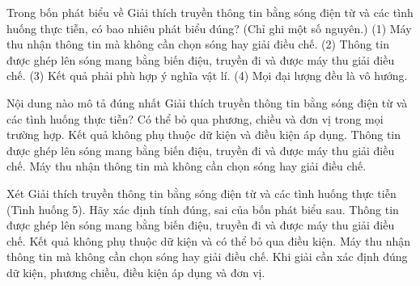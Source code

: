 \begin{ex}
Trong bốn phát biểu về Giải thích truyền thông tin bằng sóng điện từ và các tình huống thực tiễn, có bao nhiêu phát biểu đúng? (Chỉ ghi một số nguyên.) (1) Máy thu nhận thông tin mà không cần chọn sóng hay giải điều chế. (2) Thông tin được ghép lên sóng mang bằng biến điệu, truyền đi và được máy thu giải điều chế. (3) Kết quả phải phù hợp ý nghĩa vật lí. (4) Mọi đại lượng đều là vô hướng.
\end{ex}

\begin{ex}
Nội dung nào mô tả đúng nhất Giải thích truyền thông tin bằng sóng điện từ và các tình huống thực tiễn?
\choice
{Có thể bỏ qua phương, chiều và đơn vị trong mọi trường hợp.}
{Kết quả không phụ thuộc dữ kiện và điều kiện áp dụng.}
{\True Thông tin được ghép lên sóng mang bằng biến điệu, truyền đi và được máy thu giải điều chế.}
{Máy thu nhận thông tin mà không cần chọn sóng hay giải điều chế.}
\end{ex}

\begin{ex}
Xét Giải thích truyền thông tin bằng sóng điện từ và các tình huống thực tiễn (Tình huống 5). Hãy xác định tính đúng, sai của bốn phát biểu sau.
\choiceTF
{\True Thông tin được ghép lên sóng mang bằng biến điệu, truyền đi và được máy thu giải điều chế.}
{Kết quả không phụ thuộc dữ kiện và có thể bỏ qua điều kiện.}
{Máy thu nhận thông tin mà không cần chọn sóng hay giải điều chế.}
{\True Khi giải cần xác định đúng dữ kiện, phương chiều, điều kiện áp dụng và đơn vị.}
\end{ex}

